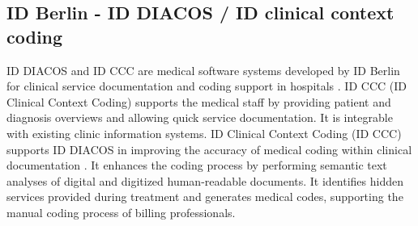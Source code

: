 \subsection{ID Berlin - ID DIACOS / ID clinical context coding}\label{subsec:id-berlin---id-clinical-context-coding}
ID DIACOS and ID CCC are medical software systems developed by ID Berlin for clinical service documentation and coding support in hospitals \cite{IDBerlin2023}.
ID CCC (ID Clinical Context Coding) supports the medical staff by providing patient and diagnosis overviews and allowing quick service documentation.
It is integrable with existing clinic information systems.
ID Clinical Context Coding (ID CCC) supports ID DIACOS in improving the accuracy of medical coding within clinical documentation \cite{IDBerlin2023}.
It enhances the coding process by performing semantic text analyses of digital and digitized human-readable documents.
It identifies hidden services provided during treatment and generates medical codes, supporting the manual coding process of billing professionals.
